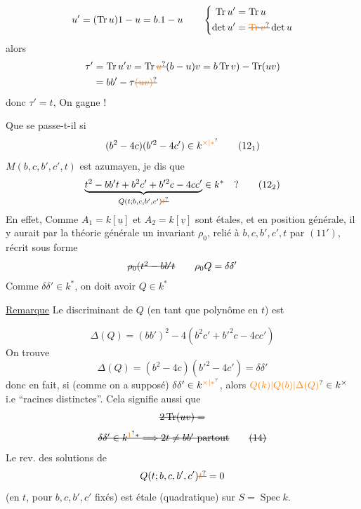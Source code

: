\[
u'=(\operatorname{Tr}u)1-u=b.1-u
\qquad\left\{\begin{aligned}\operatorname{Tr}u'&=\operatorname{Tr}u\\ \det u'&=\deleted{\unsure{\operatorname{Tr}v}}\det u\end{aligned}\right.
\]
alors
\[\begin{aligned}
\tau'&=\operatorname{Tr}u'v=\operatorname{Tr}\deleted{\unsure{u}}(b-u)v=b\operatorname{Tr}v)-\operatorname{Tr}(uv)\\
&=bb'-\tau\deleted{\unsure{(uv)}}
\end{aligned}\]
donc  $\tau'=t$, On gagne !

Que se passe-t-il si
\[ (b^2-4c)(b'^2-4c')\in k^{\unsure{\times|*}} \tag*{$(12_1)$} \]
  $M(b,c,b',c',t)$ est azumayen, je dis que
\[ \underbrace{t^2-bb't+b^2c'+b'^2c-4cc'}_{Q(t;b,c,b',c')\deleted{\unsure{t}}}\in k^*\quad ? \tag*{$(12_2)$} \]
 En effet, 
Comme $A_1=k[\underline u]$ et $A_2=k[\underline v]$  sont étales, et en position générale, il  y aurait par la théorie générale un invariant $\rho_0$, relié à $b,c,b',c',t$ par $(11')$, récrit sous forme
\[ \deleted{\rho_0(t^2-bb't}\qquad \rho_0Q=\delta\delta' \]
Comme $\delta\delta'\in k^*$, on doit avoir $Q\in k^*$

\uline{Remarque} Le discriminant de $Q$ (en tant que polynôme en $t$) est

\[ \Delta(Q)=(bb')^2-4(b^2c'+b'^2c-4cc') \]
On trouve
\[ \Delta(Q)=(b^2-4c)(b'^2-4c')=\delta\delta' \tag*{(13)} \]
donc en fait, si \deleted{\unsure{(}} (comme on a supposé) $\delta\delta'\in k^{\unsure{\times|*}}$, alors $\unsure{Q(k)|Q(b)|\Delta(Q)}\in k^{\times}$ i.e ``racines distinctes''. Cela signifie aussi que 
\[ \deleted{2\operatorname{Tr}(uv)=} \]
\[ \deleted{\delta\delta'\in k^{\unsure{1}*}\Longrightarrow 2t\ne bb'\ \text{partout}}\tag*{\deleted{(14)}} \]
 Le rev. des solutions de
\[ Q(t;b,c,b',c')\deleted{\unsure{t}}=0 \]
(en $t$, pour $b,c,b',c'$ fixés) est étale (quadratique) sur $S=\operatorname{Spec}k$.

